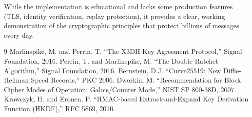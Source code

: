 \documentclass[12pt,a4paper]{article}
\begin{document}
While the implementation is educational and lacks some production features (TLS, identity verification, replay protection), it provides a clear, working demonstration of the cryptographic principles that protect billions of messages every day.

\begin{thebibliography}{9}
 Marlinspike, M. and Perrin, T. ``The X3DH Key Agreement Protocol,'' Signal Foundation, 2016.
 Perrin, T. and Marlinspike, M. ``The Double Ratchet Algorithm,'' Signal Foundation, 2016.
 Bernstein, D.J. ``Curve25519: New Diffie-Hellman Speed Records,'' PKC 2006.
 Dworkin, M. ``Recommendation for Block Cipher Modes of Operation: Galois/Counter Mode,'' NIST SP 800-38D, 2007.
 Krawczyk, H. and Eronen, P. ``HMAC-based Extract-and-Expand Key Derivation Function (HKDF),'' RFC 5869, 2010.
\end{thebibliography}
\end{document}
